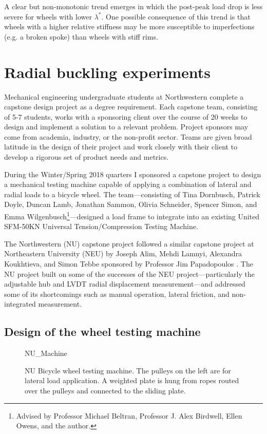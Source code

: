 \documentclass[\rootdir/thesis.tex]{subfiles}
\begin{document}
A clear but non-monotonic trend emerges in which the post-peak load drop is less severe for wheels with lower $\lambda^*$. One possible consequence of this trend is that wheels with a higher relative stiffness may be more susceptible to imperfections (e.g. a broken spoke) than wheels with stiff rims.


\section{Radial buckling experiments}

Mechanical engineering undergraduate students at Northwestern complete a capstone design project as a degree requirement. Each capstone team, consisting of 5-7 students, works with a sponsoring client over the course of 20 weeks to design and implement a solution to a relevant problem. Project sponsors may come from academia, industry, or the non-profit sector. Teams are given broad latitude in the design of their project and work closely with their client to develop a rigorous set of product needs and metrics.

During the Winter/Spring 2018 quarters I sponsored a capstone project to design a mechanical testing machine capable of applying a combination of lateral and radial loads to a bicycle wheel. The team---consisting of Tina Dornbusch, Patrick Doyle, Duncan Lamb, Jonathan Sammon, Olivia Schneider, Spencer Simon, and Emma Wilgenbusch\footnote{Advised by Professor Michael Beltran, Professor J. Alex Birdwell, Ellen Owens, and the author.}---designed a load frame to integrate into an existing United SFM-50KN Universal Tension/Compression Testing Machine.

The Northwestern (NU) capstone project followed a similar capstone project at Northeastern University (NEU) by Joseph Alim, Mehdi Lamnyi, Alexandra Koukhtieva, and Simon Tebbe sponsored by Professor Jim Papadopoulos \cite{Alim2016}. The NU project built on some of the successes of the NEU project---particularly the adjustable hub and LVDT radial displacement measurement---and addressed some of its shortcomings such as manual operation, lateral friction, and non-integrated measurement.

\subsection{Design of the wheel testing machine}

\begin{figure}
\centering
{NU_Machine}
\caption{NU Bicycle wheel testing machine. The pulleys on the left are for lateral load application. A weighted plate is hung from ropes routed over the pulleys and connected to the sliding plate.}
\label{fig:NU_Machine}
\end{figure}
\end{document}
